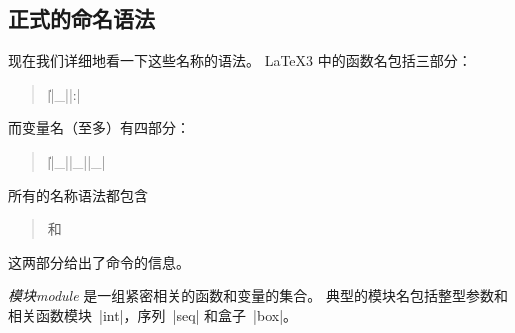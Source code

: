 \documentclass{l3doc}
\begin{document}
\subsection{正式的命名语法}
%

现在我们详细地看一下这些名称的语法。
\LaTeX3 中的函数名包括三部分：
\begin{quote}
    |\||_||:|
\end{quote}
而变量名（至多）有四部分：
\begin{quote}
    |\||_||_||_|
\end{quote}

%

所有的名称语法都包含
\begin{quote}
     和 
\end{quote}
这两部分给出了命令的信息。

%
%
\emph{模块module} 是一组紧密相关的函数和变量的集合。
典型的模块名包括整型参数和相关函数模块~|int|，序列~|seq| 和盒子~|box|。

%
\end{document}
